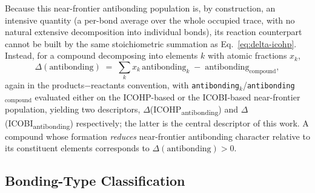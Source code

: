 \documentclass[journal=jpccck,manuscript=article]{achemso}
\begin{document}
Because this near-frontier antibonding population is, by construction, an
intensive quantity (a per-bond average over the whole occupied trace, with
no natural extensive decomposition into individual bonds), its reaction
counterpart cannot be built by the same stoichiometric summation as
Eq.~\ref{eq:delta-icohp}. Instead, for a compound decomposing into elements
$k$ with atomic fractions $x_k$,
\begin{equation}
  \Delta(\text{antibonding}) \;=\; \sum_{k} x_k\,\text{antibonding}_k
  \;-\; \text{antibonding}_\text{compound} ,
  \label{eq:delta-antibonding}
\end{equation}
again in the products$-$reactants convention, with
\texttt{antibonding}$_k$/\texttt{antibonding}$_\text{compound}$ evaluated
either on the ICOHP-based or the ICOBI-based near-frontier population,
yielding two descriptors, $\Delta$(ICOHP\textsubscript{antibonding}) and
$\Delta$(ICOBI\textsubscript{antibonding}) respectively; the latter is the
central descriptor of this work. A compound whose formation \emph{reduces}
near-frontier antibonding character relative to its constituent elements
corresponds to $\Delta(\text{antibonding}) > 0$.

\subsection{Bonding-Type Classification}
\label{sec:bondtype}
\end{document}
